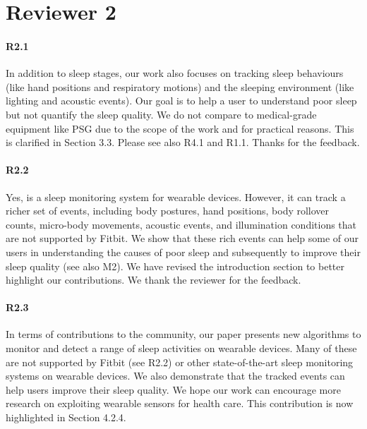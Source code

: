 \section*{Reviewer 2}
\paragraph{R2.1} In addition to sleep stages, our work also focuses on tracking sleep behaviours (like hand positions and respiratory motions) and the sleeping
environment (like lighting and acoustic events). Our goal is to help a user to understand poor sleep but not quantify the sleep quality. We
do not compare to medical-grade equipment like PSG due to the scope of the work and for practical reasons. This is clarified in
Section 3.3. Please see also R4.1 and R1.1. Thanks for the feedback.


\paragraph{R2.2} Yes, \systemname is a sleep monitoring system for wearable devices. However, it can track a richer set of events,
including body postures, hand positions, body rollover counts, micro-body movements, acoustic events, and illumination conditions that are
not supported by Fitbit. We show that these rich events can help some of our users in understanding the causes of poor sleep and
subsequently to improve their sleep quality (see also M2). We have revised the introduction section to better highlight our contributions.
We thank the reviewer for the feedback.

\paragraph{R2.3} In terms of contributions to the community, our paper presents new algorithms to monitor and detect a range of sleep
activities on wearable devices. Many of these are not supported by Fitbit (see R2.2) or other state-of-the-art sleep monitoring systems on
wearable devices. We also demonstrate that the tracked events can help users improve their sleep quality. We hope our work can encourage
more research on exploiting wearable sensors for health care.   This contribution is now highlighted in Section 4.2.4.
